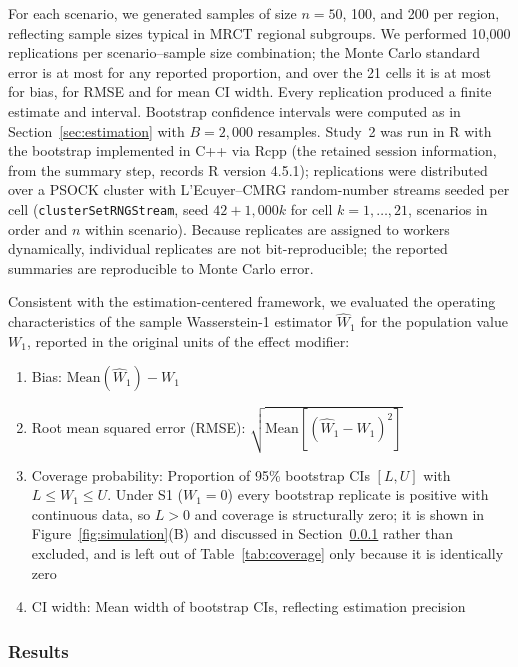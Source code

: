 \documentclass[AMA,Times1COL]{WileyNJDv5}
\begin{document}
For each scenario, we generated samples of size $n = 50$, 100, and 200 per region, reflecting sample sizes typical in MRCT regional subgroups. We performed 10{,}000 replications per scenario--sample size combination; the Monte Carlo standard error is at most  for any reported proportion, and over the 21 cells it is at most  for bias,  for RMSE and  for mean CI width. Every replication produced a finite estimate and interval. Bootstrap confidence intervals were computed as in Section~\ref{sec:estimation} with $B = 2{,}000$ resamples. Study~2 was run in R with the bootstrap implemented in C++ via Rcpp (the retained session information, from the summary step, records R version 4.5.1); replications were distributed over a PSOCK cluster with L'Ecuyer--CMRG random-number streams seeded per cell (\texttt{clusterSetRNGStream}, seed $42 + 1{,}000k$ for cell $k = 1, \ldots, 21$, scenarios in order and $n$ within scenario). Because replicates are assigned to workers dynamically, individual replicates are not bit-reproducible; the reported summaries are reproducible to Monte Carlo error.

Consistent with the estimation-centered framework, we evaluated the operating characteristics of the sample Wasserstein-1 estimator $\widehat{W}_1$ for the population value $W_1$, reported in the original units of the effect modifier:
\begin{enumerate}[1.]
\item Bias: $\text{Mean}(\widehat{W}_1) - W_1$
\item Root mean squared error (RMSE): $\sqrt{\text{Mean}[(\widehat{W}_1 - W_1)^2]}$
\item Coverage probability: Proportion of 95\% bootstrap CIs $[L, U]$ with $L \le W_1 \le U$. Under S1 ($W_1 = 0$) every bootstrap replicate is positive with continuous data, so $L > 0$ and coverage is structurally zero; it is shown in Figure~\ref{fig:simulation}(B) and discussed in Section~\ref{sec:sim_results} rather than excluded, and is left out of Table~\ref{tab:coverage} only because it is identically zero
\item CI width: Mean width of bootstrap CIs, reflecting estimation precision
\end{enumerate}

\subsubsection{Results}\label{sec:sim_results}
\end{document}
